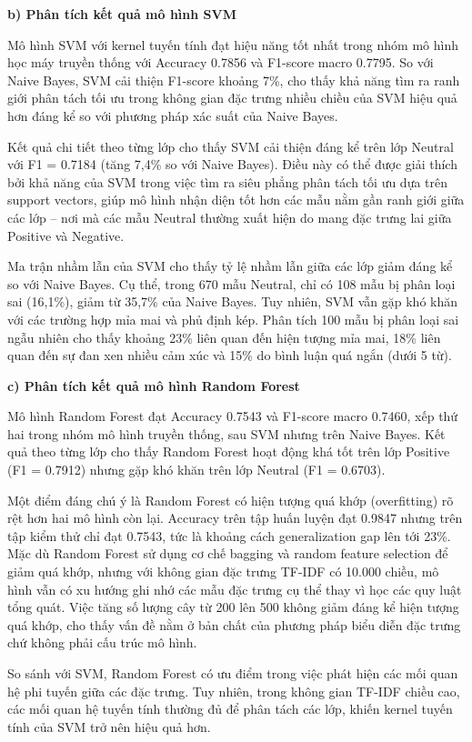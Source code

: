 \documentclass[14pt, a4paper]{report}
\begin{document}
\textbf{b) Phân tích kết quả mô hình SVM}


Mô hình SVM với kernel tuyến tính đạt hiệu năng tốt nhất trong nhóm mô hình học máy truyền thống với Accuracy 0.7856 và F1-score macro 0.7795. So với Naive Bayes, SVM cải thiện F1-score khoảng 7\%, cho thấy khả năng tìm ra ranh giới phân tách tối ưu trong không gian đặc trưng nhiều chiều của SVM hiệu quả hơn đáng kể so với phương pháp xác suất của Naive Bayes.


Kết quả chi tiết theo từng lớp cho thấy SVM cải thiện đáng kể trên lớp Neutral với F1 = 0.7184 (tăng 7,4\% so với Naive Bayes). Điều này có thể được giải thích bởi khả năng của SVM trong việc tìm ra siêu phẳng phân tách tối ưu dựa trên support vectors, giúp mô hình nhận diện tốt hơn các mẫu nằm gần ranh giới giữa các lớp – nơi mà các mẫu Neutral thường xuất hiện do mang đặc trưng lai giữa Positive và Negative.


Ma trận nhầm lẫn của SVM cho thấy tỷ lệ nhầm lẫn giữa các lớp giảm đáng kể so với Naive Bayes. Cụ thể, trong 670 mẫu Neutral, chỉ có 108 mẫu bị phân loại sai (16,1\%), giảm từ 35,7\% của Naive Bayes. Tuy nhiên, SVM vẫn gặp khó khăn với các trường hợp mỉa mai và phủ định kép. Phân tích 100 mẫu bị phân loại sai ngẫu nhiên cho thấy khoảng 23\% liên quan đến hiện tượng mỉa mai, 18\% liên quan đến sự đan xen nhiều cảm xúc và 15\% do bình luận quá ngắn (dưới 5 từ).


\textbf{c) Phân tích kết quả mô hình Random Forest}


Mô hình Random Forest đạt Accuracy 0.7543 và F1-score macro 0.7460, xếp thứ hai trong nhóm mô hình truyền thống, sau SVM nhưng trên Naive Bayes. Kết quả theo từng lớp cho thấy Random Forest hoạt động khá tốt trên lớp Positive (F1 = 0.7912) nhưng gặp khó khăn trên lớp Neutral (F1 = 0.6703).


Một điểm đáng chú ý là Random Forest có hiện tượng quá khớp (overfitting) rõ rệt hơn hai mô hình còn lại. Accuracy trên tập huấn luyện đạt 0.9847 nhưng trên tập kiểm thử chỉ đạt 0.7543, tức là khoảng cách generalization gap lên tới 23\%. Mặc dù Random Forest sử dụng cơ chế bagging và random feature selection để giảm quá khớp, nhưng với không gian đặc trưng TF-IDF có 10.000 chiều, mô hình vẫn có xu hướng ghi nhớ các mẫu đặc trưng cụ thể thay vì học các quy luật tổng quát. Việc tăng số lượng cây từ 200 lên 500 không giảm đáng kể hiện tượng quá khớp, cho thấy vấn đề nằm ở bản chất của phương pháp biểu diễn đặc trưng chứ không phải cấu trúc mô hình.


So sánh với SVM, Random Forest có ưu điểm trong việc phát hiện các mối quan hệ phi tuyến giữa các đặc trưng. Tuy nhiên, trong không gian TF-IDF chiều cao, các mối quan hệ tuyến tính thường đủ để phân tách các lớp, khiến kernel tuyến tính của SVM trở nên hiệu quả hơn.
\end{document}
